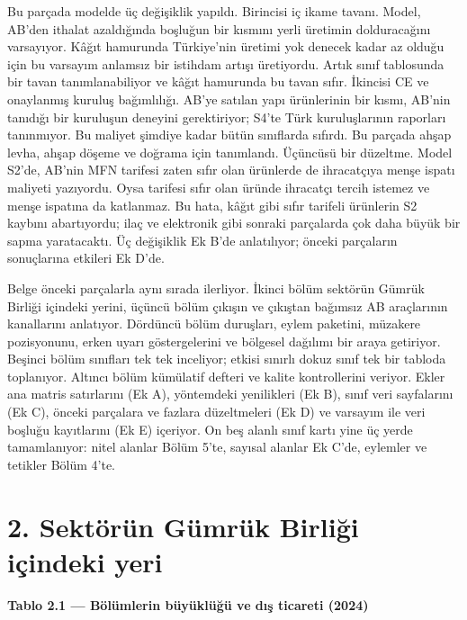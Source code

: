 Bu parçada modelde üç değişiklik yapıldı. Birincisi iç ikame tavanı. Model, AB'den ithalat azaldığında boşluğun bir kısmını yerli üretimin dolduracağını varsayıyor. Kâğıt hamurunda Türkiye'nin üretimi yok denecek kadar az olduğu için bu varsayım anlamsız bir istihdam artışı üretiyordu. Artık sınıf tablosunda bir tavan tanımlanabiliyor ve kâğıt hamurunda bu tavan sıfır. İkincisi CE ve onaylanmış kuruluş bağımlılığı. AB'ye satılan yapı ürünlerinin bir kısmı, AB'nin tanıdığı bir kuruluşun deneyini gerektiriyor; S4'te Türk kuruluşlarının raporları tanınmıyor. Bu maliyet şimdiye kadar bütün sınıflarda sıfırdı. Bu parçada ahşap levha, ahşap döşeme ve doğrama için tanımlandı. Üçüncüsü bir düzeltme. Model S2'de, AB'nin MFN tarifesi zaten sıfır olan ürünlerde de ihracatçıya menşe ispatı maliyeti yazıyordu. Oysa tarifesi sıfır olan üründe ihracatçı tercih istemez ve menşe ispatına da katlanmaz. Bu hata, kâğıt gibi sıfır tarifeli ürünlerin S2 kaybını abartıyordu; ilaç ve elektronik gibi sonraki parçalarda çok daha büyük bir sapma yaratacaktı. Üç değişiklik Ek B'de anlatılıyor; önceki parçaların sonuçlarına etkileri Ek D'de.

Belge önceki parçalarla aynı sırada ilerliyor. İkinci bölüm sektörün Gümrük Birliği içindeki yerini, üçüncü bölüm çıkışın ve çıkıştan bağımsız AB araçlarının kanallarını anlatıyor. Dördüncü bölüm duruşları, eylem paketini, müzakere pozisyonunu, erken uyarı göstergelerini ve bölgesel dağılımı bir araya getiriyor. Beşinci bölüm sınıfları tek tek inceliyor; etkisi sınırlı dokuz sınıf tek bir tabloda toplanıyor. Altıncı bölüm kümülatif defteri ve kalite kontrollerini veriyor. Ekler ana matris satırlarını (Ek A), yöntemdeki yenilikleri (Ek B), sınıf veri sayfalarını (Ek C), önceki parçalara ve fazlara düzeltmeleri (Ek D) ve varsayım ile veri boşluğu kayıtlarını (Ek E) içeriyor. On beş alanlı sınıf kartı yine üç yerde tamamlanıyor: nitel alanlar Bölüm 5'te, sayısal alanlar Ek C'de, eylemler ve tetikler Bölüm 4'te.

\hypertarget{nace_kartlar_16-18-2-sektuxf6ruxfcn-guxfcmruxfck-birliux11fi-iuxe7indeki-yeri}{%
\section{2. Sektörün Gümrük Birliği içindeki yeri}\label{nace_kartlar_16-18-2-sektuxf6ruxfcn-guxfcmruxfck-birliux11fi-iuxe7indeki-yeri}}


\textbf{Tablo 2.1 --- Bölümlerin büyüklüğü ve dış ticareti (2024)}

